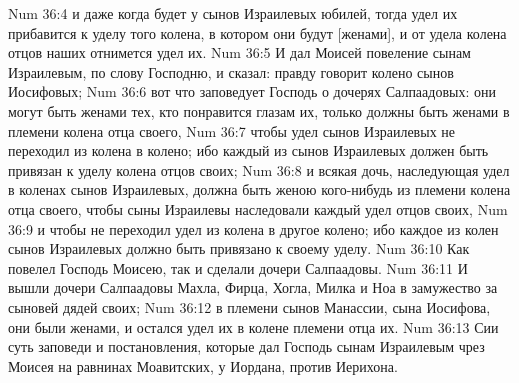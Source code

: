 \vs Num 36:4 и даже когда будет у сынов Израилевых юбилей, тогда удел их прибавится к уделу того колена, в котором они будут [женами], и от удела колена отцов наших отнимется удел их.
\vs Num 36:5 И дал Моисей повеление сынам Израилевым, по слову Господню, и сказал: правду говорит колено сынов Иосифовых;
\vs Num 36:6 вот что заповедует Господь о дочерях Салпаадовых: они могут быть женами тех, кто понравится глазам их, только должны быть женами в племени колена отца своего,
\vs Num 36:7 чтобы удел сынов Израилевых не переходил из колена в колено; ибо каждый из сынов Израилевых должен быть привязан к уделу колена отцов своих;
\vs Num 36:8 и всякая дочь, наследующая удел в коленах сынов Израилевых, должна быть женою кого-нибудь из племени колена отца своего, чтобы сыны Израилевы наследовали каждый удел отцов своих,
\vs Num 36:9 и чтобы не переходил удел из колена в другое колено; ибо каждое из колен сынов Израилевых должно быть привязано к своему уделу.
\vs Num 36:10 Как повелел Господь Моисею, так и сделали дочери Салпаадовы.
\vs Num 36:11 И вышли дочери Салпаадовы Махла, Фирца, Хогла, Милка и Ноа в замужество за сыновей дядей своих;
\vs Num 36:12 в племени сынов Манассии, сына Иосифова, они были женами, и остался удел их в колене племени отца их.
\rsbpar\vs Num 36:13 Сии суть заповеди и постановления, которые дал Господь сынам Израилевым чрез Моисея на равнинах Моавитских, у Иордана, против Иерихона.
